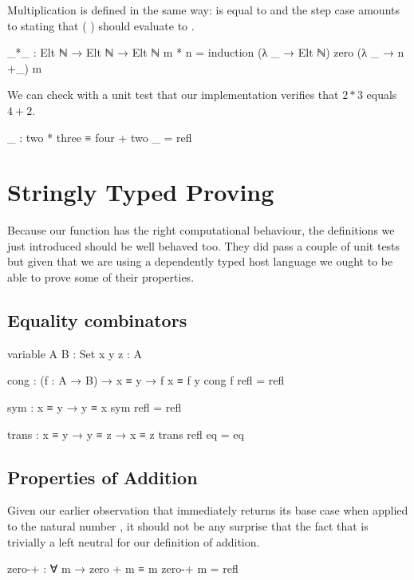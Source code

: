 \documentclass[twocolumn]{article}
\begin{document}
Multiplication is defined in the same way:  \AF{*} 
is equal to  and the step case amounts to stating that
( ) \AF{*}  should evaluate to
 \AF{+}  \AF{*} .

\begin{code}
_*_ : Elt ℕ → Elt ℕ → Elt ℕ
m * n = induction (λ _ → Elt ℕ) zero (λ _ → n +_) m
\end{code}

We can check with a unit test that our implementation verifies that
$2*3$ equals $4+2$.

\begin{code}
_ : two * three ≡ four + two
_ = refl
\end{code}

\section{Stringly Typed Proving}

Because our  function has the right computational behaviour,
the definitions we just introduced should be well behaved too. They did pass
a couple of unit tests but given that we are using a dependently typed host
language we ought to be able to prove some of their properties.

\subsection{Equality combinators}

\begin{code}
variable
  A B : Set
  x y z : A

cong : (f : A → B) → x ≡ y → f x ≡ f y
cong f refl = refl

sym : x ≡ y → y ≡ x
sym refl = refl

trans : x ≡ y → y ≡ z → x ≡ z
trans refl eq = eq
\end{code}

\subsection{Properties of Addition}

Given our earlier observation that  immediately returns its
base case when applied to the natural number , it should not be
any surprise that the fact that  is trivially a left neutral for
our definition of addition.

\begin{code}
zero-+ : ∀ m → zero + m ≡ m
zero-+ m = refl
\end{code}
\end{document}
